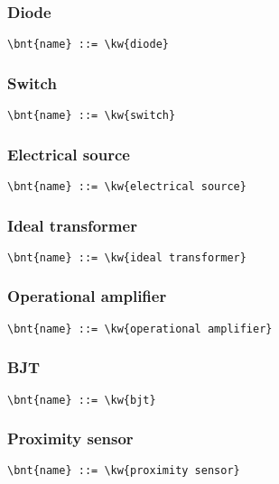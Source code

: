 \subsubsection{Diode}
\begin{Verbatim}[commandchars=\\\{\}]
    \bnt{name} ::= \kw{diode}
\end{Verbatim}

\subsubsection{Switch}
\begin{Verbatim}[commandchars=\\\{\}]
    \bnt{name} ::= \kw{switch}
\end{Verbatim}

\subsubsection{Electrical source}
\begin{Verbatim}[commandchars=\\\{\}]
    \bnt{name} ::= \kw{electrical source}
\end{Verbatim}

\subsubsection{Ideal transformer}
\begin{Verbatim}[commandchars=\\\{\}]
    \bnt{name} ::= \kw{ideal transformer}
\end{Verbatim}

\subsubsection{Operational amplifier}
\begin{Verbatim}[commandchars=\\\{\}]
    \bnt{name} ::= \kw{operational amplifier}
\end{Verbatim}

\subsubsection{BJT}
\begin{Verbatim}[commandchars=\\\{\}]
    \bnt{name} ::= \kw{bjt}
\end{Verbatim}

\subsubsection{Proximity sensor}
\begin{Verbatim}[commandchars=\\\{\}]
    \bnt{name} ::= \kw{proximity sensor}
\end{Verbatim}



